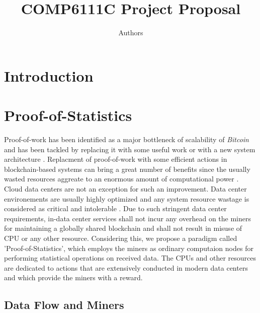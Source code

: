 \documentclass{article}
\title{COMP6111C Project Proposal}
\author{Authors}
\date{}
\begin{document}
\maketitle


\section{Introduction}


\section{Proof-of-Statistics}
Proof-of-work has been identified as a major bottleneck of scalability of \textit{Bitcoin}  and has been tackled by replacing it with some useful work \cite{filecoin-storage} or with a new system architecture \cite{RSCoin-bank}.  Replacment of proof-of-work with some  
efficient actions in blockchain-based systems can bring a great number of benefits since the usually wasted resources aggreate to an enormous amount of  computational power \cite{bitcoin-comp-elec-power}. Cloud data centers are not an exception for such an 
improvement. Data center environements are usually highly optimized and any system resource wastage is considered as critical and intolerable \cite{google-ai-power, facebook-cold-storage-rack}. Due to such stringent data center requirements, in-data center services
shall not incur any overhead on the miners for maintaining a globally shared blockchain and shall not result in misuse of CPU or any other resource. Considering this, we propose a paradigm called 'Proof-of-Statistics', which employs the miners as ordinary computaion nodes
for performing statistical operations on received data. The CPUs and other resources are dedicated to actions that are extensively conducted in modern data centers \cite{microsoft-autopilot} and which provide the miners with a reward. 

\subsection{Data Flow and Miners}
 



     
\newpage


\end{document}
